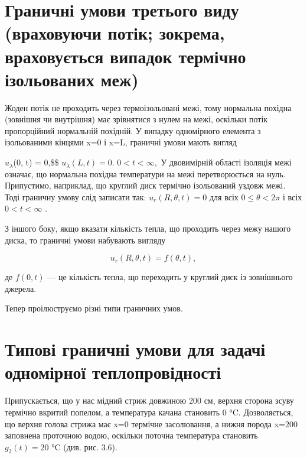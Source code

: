 \documentclass[
  ukrainian,
]{article}
\begin{document}
\section{Граничні умови третього виду (враховуючи потік; зокрема,
враховується випадок термічно ізольованих
меж)}\label{ux433ux440ux430ux43dux438ux447ux43dux456-ux443ux43cux43eux432ux438-ux442ux440ux435ux442ux44cux43eux433ux43e-ux432ux438ux434ux443-ux432ux440ux430ux445ux43eux432ux443ux44eux447ux438-ux43fux43eux442ux456ux43a-ux437ux43eux43aux440ux435ux43cux430-ux432ux440ux430ux445ux43eux432ux443ux454ux442ux44cux441ux44f-ux432ux438ux43fux430ux434ux43eux43a-ux442ux435ux440ux43cux456ux447ux43dux43e-ux456ux437ux43eux43bux44cux43eux432ux430ux43dux438ux445-ux43cux435ux436}

Жоден потік не проходить через термоізольовані межі, тому нормальна
похідна (зовнішня чи внутрішня) має зрівнятися з нулем на межі, оскільки
потік пропорційний нормальній похідній. У випадку одномірного елемента з
ізольованими кінцями x=0 і x=L, граничні умови мають вигляд

\(u_{\lambda}\)(0, t) = 0,\$\$ \(u_{\lambda}(L, t) = 0.\)
\(0 < t < \infty,\) У двовимірній області ізоляція межі означає, що
нормальна похідна температури на межі перетворюється на нуль.
Припустимо, наприклад, що круглий диск термічно ізольований уздовж межі.
Тоді граничну умову слід записати так: \(u_r(R, \theta, t) = 0\) для
всіх \(0 \le \theta < 2\pi\) і всіх \(0 < t < \infty\) .

З іншого боку, якщо вказати кількість тепла, що проходить через межу
нашого диска, то граничні умови набувають вигляду

\[
u_r(R, \theta, t) = f(\theta, t),
\]

де \(f(0, t)\) --- це кількість тепла, що переходить у круглий диск із
зовнішнього джерела.

Тепер проілюструємо різні типи граничних умов.

\section{Типові граничні умови для задачі одномірної
теплопровідності}\label{ux442ux438ux43fux43eux432ux456-ux433ux440ux430ux43dux438ux447ux43dux456-ux443ux43cux43eux432ux438-ux434ux43bux44f-ux437ux430ux434ux430ux447ux456-ux43eux434ux43dux43eux43cux456ux440ux43dux43eux457-ux442ux435ux43fux43bux43eux43fux440ux43eux432ux456ux434ux43dux43eux441ux442ux456}

Припускається, що у нас мідний стриж довжиною 200 см, верхня сторона
зсуву термічно вкритий попелом, а температура качана становить 0 °C.
Дозволяється, що верхня голова стрижа має x=0 термічне засолювання, а
нижня порода x=200 заповнена проточною водою, оскільки поточна
температура становить \(g_2(t)=20\) °C (див. рис. 3.6).
\end{document}
